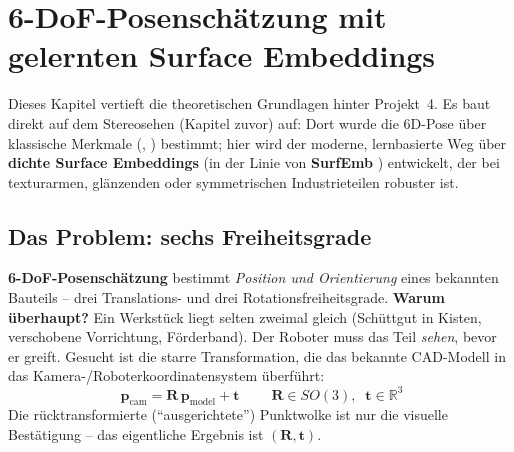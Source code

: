 
\chapter{6-DoF-Posenschätzung mit gelernten Surface Embeddings}

Dieses Kapitel vertieft die theoretischen Grundlagen hinter Projekt~4. Es baut
direkt auf dem Stereosehen (Kapitel zuvor) auf: Dort wurde die 6D-Pose über
klassische Merkmale (, ) bestimmt; hier wird der moderne,
lernbasierte Weg über \textbf{dichte Surface Embeddings} (in der Linie von
\textbf{SurfEmb} \cite{haugaard2022surfemb}) entwickelt, der bei
texturarmen, glänzenden oder symmetrischen Industrieteilen robuster ist.

\section{Das Problem: sechs Freiheitsgrade}
\textbf{6-DoF-Posenschätzung} bestimmt \emph{Position und Orientierung} eines
bekannten Bauteils -- drei Translations- und drei Rotationsfreiheitsgrade.
\textbf{Warum überhaupt?} Ein Werkstück liegt selten zweimal gleich (Schüttgut
in Kisten, verschobene Vorrichtung, Förderband). Der Roboter muss das Teil
\emph{sehen}, bevor er greift. Gesucht ist die starre Transformation, die das
bekannte CAD-Modell in das Kamera-/Roboterkoordinatensystem überführt:
\begin{equation}
\boxed{\;\bm{p}_{\text{cam}} = \bm{R}\,\bm{p}_{\text{model}} + \bm{t}\;}
\qquad \bm{R}\in SO(3),\;\; \bm{t}\in\mathbb{R}^3
\end{equation}
Die rücktransformierte (``ausgerichtete'') Punktwolke ist nur die visuelle
Bestätigung -- das eigentliche Ergebnis ist $(\bm{R},\bm{t})$.

